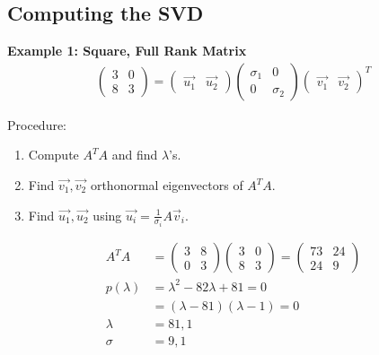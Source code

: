 \subsection{Computing the SVD}
\noindent
\newline
\textbf{Example 1: Square, Full Rank Matrix}
\begin{align}
    \begin{pmatrix}
        3 & 0 \\ 8 & 3 
    \end{pmatrix} = \begin{pmatrix}
        \Vec{u_1} & \Vec{u_2}
    \end{pmatrix} \begin{pmatrix}
        \sigma_1 & 0 \\ 0 & \sigma_2
    \end{pmatrix} \begin{pmatrix}
        \Vec{v_1} & \Vec{v_2}
    \end{pmatrix}^T
\end{align}

\noindent
Procedure:
\begin{enumerate}
    \item Compute \(A^T A\) and find \(\lambda\)'s.
    \item Find \(\Vec{v_1}, \Vec{v_2}\) orthonormal eigenvectors of \(A^T A\).
    \item Find \(\Vec{u_1}, \Vec{u_2}\) using \(\Vec{u_i} = \frac{1}{\sigma_i} A\Vec{v}_i\).
\end{enumerate}

\begin{align}
    A^T A &= \begin{pmatrix}
        3 & 8 \\ 0 & 3
    \end{pmatrix} \begin{pmatrix}
        3 & 0 \\ 8 & 3
    \end{pmatrix} = \begin{pmatrix}
        73 & 24 \\ 24 & 9
    \end{pmatrix} \\
    p(\lambda) &= \lambda^2 - 82 \lambda + 81 = 0 \\
    &= (\lambda - 81)(\lambda - 1) = 0 \\
    \lambda &= 81, 1 \\
    \sigma &= 9, 1
\end{align}

